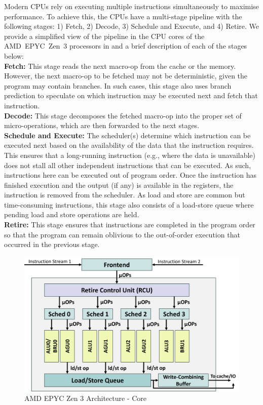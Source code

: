 Modern CPUs rely on executing multiple instructions simultaneously to maximise performance.
To achieve this, the CPUs have a multi-stage pipeline with the following stages: 1) Fetch, 2) Decode, 3) Schedule and Execute, and 4) Retire.
We provide a simplified view of the pipeline in the CPU cores of the AMD~EPYC~Zen~3 processors in  and a brief description of each of the stages below:\\
\textbf{Fetch: } This stage reads the next macro-op from the cache or the memory. 
However, the next macro-op to be fetched may not be deterministic, given the program may contain branches. 
In such cases, this stage also uses branch prediction to speculate on which instruction may be executed next and fetch that instruction.\\
\textbf{Decode: } This stage decomposes the fetched macro-op into the proper set of micro-operations, which are then forwarded to the next stages.\\
\textbf{Schedule and Execute: } The scheduler(s) determine which instruction can be executed next based on the availability of the data that the instruction requires. 
This ensures that a long-running instruction (e.g., where the data is unavailable) does not stall all other independent instructions that can be executed.
As such, instructions here can be executed out of program order. 
Once the instruction has finished execution and the output (if any) is available in the registers, the instruction is removed from the scheduler.
As load and store are common but time-consuming instructions, this stage also consists of a load-store queue where pending load and store operations are held. \\
\textbf{Retire: } This stage ensures that instructions are completed in the program order so that the program can remain oblivious to the out-of-order execution that occurred in the previous stage.

\begin{figure}[!htb]
    \centering
    \includegraphics[width=\columnwidth]{figures/interconnect-sc/amd_arch/core.png}
    \caption{AMD EPYC Zen 3 Architecture - Core}
    \label{fig:amd-core}
\end{figure}

